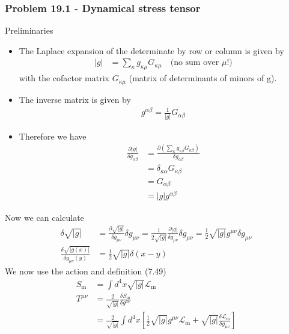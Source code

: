 \documentclass[10pt,a4paper]{book}
\theoremstyle{definition}
\begin{document}
\subsubsection{Problem 19.1 - Dynamical stress tensor}
Preliminaries
\begin{itemize} 
\item The Laplace expansion of the determinate by row or column is given by
\begin{align}
    |g|&=\sum_\kappa g_{\kappa\mu}G_{\kappa\mu}\quad\text{(no sum over $\mu$!)}
\end{align}
with the cofactor matrix $G_{\kappa\mu}$ (matrix of determinants of minors of g).
\item The inverse matrix is given by
\begin{align}
    g^{\alpha\beta}=\frac{1}{|g|}G_{\alpha\beta}
\end{align}
\item Therefore we have
\begin{align}
    \frac{\partial|g|}{\delta g_{\alpha\beta}}
    &=\frac{\partial\left(\sum_\kappa g_{\kappa\beta}G_{\kappa\beta}\right)}{\delta g_{\alpha\beta}}\\
    &=\delta_{\kappa\alpha}G_{\kappa\beta}\\
    &=G_{\alpha\beta}\\
    &=|g|g^{\alpha\beta}
\end{align}
\end{itemize}
Now we can calculate
\begin{align}
    \delta\sqrt{|g|}
    &=\frac{\partial\sqrt{|g|}}{\delta g_{\mu\nu}}\delta g_{\mu\nu}
    =\frac{1}{2\sqrt{|g|}}\frac{\partial|g|}{\delta g_{\mu\nu}}\delta g_{\mu\nu}
    =\frac{1}{2}\sqrt{|g|}g^{\mu\nu}\delta g_{\mu\nu}\\
    \frac{\delta\sqrt{|g(x)|}}{\delta g_{\mu\nu}(y)}
    &=\frac{1}{2}\sqrt{|g|}\delta(x-y)
\end{align}
We now use the action and definition (7.49)
\begin{align}
    S_\text{m}&=\int d^4x\sqrt{|g|}\mathscr{L}_\text{m}\\
    T^{\mu\nu}&=\frac{2}{\sqrt{|g|}}\frac{\delta S_\text{m}}{\delta g^{\mu\nu}}\\
    &=\frac{2}{\sqrt{|g|}}\int d^4x\left[\frac{1}{2}\sqrt{|g|}g^{\mu\nu}\mathscr{L}_\text{m}+\sqrt{|g|}\frac{\delta\mathscr{L}_\text{m}}{\delta g_{\mu\nu}}\right]
\end{align}
\end{document}
